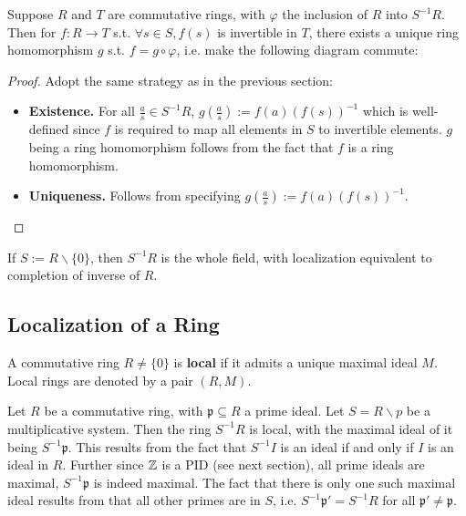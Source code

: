 \documentclass{article}
\begin{document}
\begin{theorem}
    Suppose $R$ and $T$ are commutative rings, with $\varphi$ the inclusion of $R$ into $S^{-1}R$. Then for $f: R\to T$ s.t. $\forall s\in S, f(s)$ is invertible in $T$, there exists a unique ring homomorphism $g$ s.t. $f = g\circ \varphi$, i.e. make the following diagram commute:
    \begin{figure}[htbp]
        \centering    
    \end{figure}
\end{theorem}

\begin{proof}
    Adopt the same strategy as in the previous section: 
    \begin{itemize}
        \item \textbf{Existence.} For all $\frac{a}{s}\in S^{-1}R$, $g(\frac{a}{s}) := f(a) (f(s))^{-1}$ which is well-defined since $f$ is required to map all elements in $S$ to invertible elements. $g$ being a ring homomorphism follows from the fact that $f$ is a ring homomorphism. 
        \item \textbf{Uniqueness.} Follows from specifying $g(\frac{a}{s}) := f(a) (f(s))^{-1}$.
    \end{itemize}
\end{proof}

\begin{remark}
    If $S := R\smallsetminus\{0\}$, then $S^{-1}R$ is the whole field, with localization equivalent to completion of inverse of $R$.
\end{remark}

\subsection{Localization of a Ring}

\begin{definition}
    A commutative ring $R\neq \{0\}$ is \textbf{local} if it admits a unique maximal ideal $M$. Local rings are denoted by a pair $(R, M)$.
\end{definition}

\begin{example}
    Let $R$ be a commutative ring, with $\mathfrak{p} \subseteq R$ a prime ideal. Let $S = R\smallsetminus p$ be a multiplicative system. Then the ring $S^{-1}R$ is local, with the maximal ideal of it being $S^{-1}\mathfrak{p}$. This results from the fact that $S^{-1}I$ is an ideal if and only if $I$ is an ideal in $R$. Further since $\mathbb{Z}$ is a PID (see next section), all prime ideals are maximal, $S^{-1}\mathfrak{p}$ is indeed maximal. The fact that there is only one such maximal ideal results from that all other primes are in $S$, i.e. $S^{-1}\mathfrak{p}'=S^{-1}R$ for all $\mathfrak{p}' \neq \mathfrak{p}$. 
\end{example}
\end{document}
